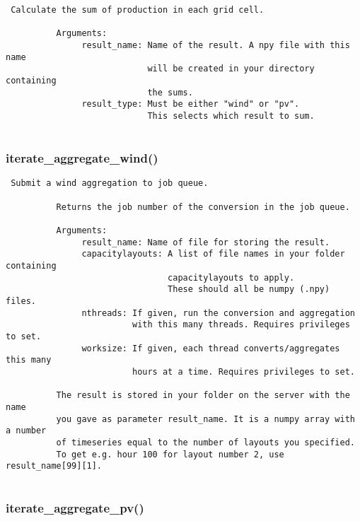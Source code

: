 \begin{verbatim}
 Calculate the sum of production in each grid cell.
          
          Arguments:
               result_name: Name of the result. A npy file with this name
                            will be created in your directory containing
                            the sums.
               result_type: Must be either "wind" or "pv".
                            This selects which result to sum.
          
\end{verbatim}
\subsubsection{iterate\_aggregate\_wind()}


\begin{verbatim}
 Submit a wind aggregation to job queue.

          Returns the job number of the conversion in the job queue.

          Arguments:
               result_name: Name of file for storing the result.
               capacitylayouts: A list of file names in your folder containing
                                capacitylayouts to apply.
                                These should all be numpy (.npy) files.
               nthreads: If given, run the conversion and aggregation
                         with this many threads. Requires privileges to set.
               worksize: If given, each thread converts/aggregates this many
                         hours at a time. Requires privileges to set.

          The result is stored in your folder on the server with the name
          you gave as parameter result_name. It is a numpy array with a number
          of timeseries equal to the number of layouts you specified.
          To get e.g. hour 100 for layout number 2, use result_name[99][1]. 
          
\end{verbatim}
\subsubsection{iterate\_aggregate\_pv()}


